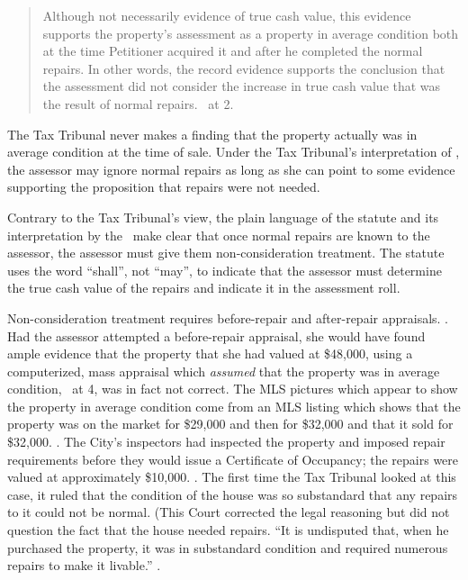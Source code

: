 \documentclass[12pt,\documentclassflag]{michiganCourtOfAppealsBrief}
\begin{document}
\begin{quote}
	Although not necessarily evidence of true cash value, this evidence supports the property's assessment as a property in average condition both at the time Petitioner acquired it and after he completed the normal repairs. In other words, the record evidence supports the conclusion that the assessment did not consider the increase in true cash value that was the result of normal repairs. \orderDenying\ at 2. 
\end{quote}

The Tax Tribunal never makes a finding that the property actually was in average condition at the time of sale. Under the Tax Tribunal's interpretation of \mathieuGast, the assessor may ignore normal repairs as long as she can point to some evidence supporting the proposition that repairs were not needed.

Contrary to the Tax Tribunal's view, the plain language of the statute and its interpretation by the \STC\ make clear that once normal repairs are known to the assessor, the assessor must give them non-consideration treatment. The statute uses the word ``shall'', not ``may'', to indicate that the assessor must determine the true cash value of the repairs and indicate it in the assessment roll.

Non-consideration treatment requires before-repair and after-repair appraisals. . Had the assessor attempted a before-repair appraisal, she would have found ample evidence that the property that she had valued at \$48,000, using a computerized, mass appraisal which \textit{assumed} that the property was in average condition, \FOJ\ at 4, was in fact not correct. The MLS pictures which appear to show the property in average condition come from an MLS listing which shows that the property was on the market for \$29,000 and then for \$32,000 and that it sold for \$32,000. \mlsprintout. The City's inspectors had inspected the property and imposed repair requirements before they would issue a Certificate of Occupancy; the repairs were valued at approximately \$10,000. \repairs. The first time the Tax Tribunal looked at this case, it ruled that the condition of the house was so substandard that any repairs to it could not be normal. (This Court corrected the legal reasoning but did not question the fact that the house needed repairs. ``It is undisputed that, when he purchased the property, it was in substandard condition and required numerous repairs to make it livable.'' .
 
\end{document}
